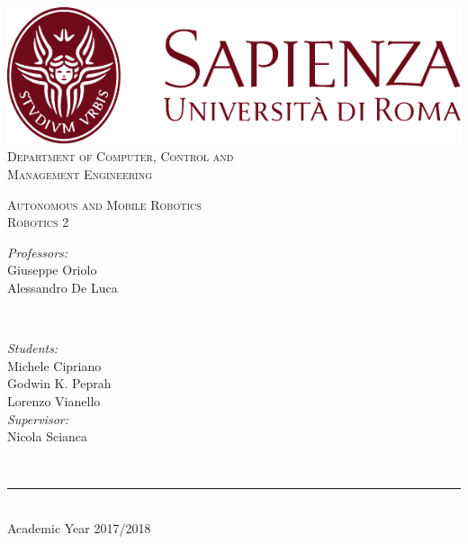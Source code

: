 \documentclass[a4paper]{article}
\begin{document}
\begin{titlepage}
	\centering
    \vspace*{0.5 cm}
    \includegraphics[scale = 0.75]{images/SapienzaLogo}\\[1.0 cm]	%

    \vspace*{-0.4cm}
    \textsc{\large Department of Computer, Control and\\Management Engineering}\\[2.0 cm]	%
    \vspace*{1cm}

    { \fontsize{20.74pt}{18.5pt}\selectfont\bfseries \thetitle \par } %

    \vspace*{0.1cm}
    \textsc{\Large Autonomous and Mobile Robotics\\Robotics 2}\\[0.5 cm] %

    \vspace*{2.6cm}
	\begin{minipage}{0.4\textwidth}
		\begin{flushleft} \large
			\emph{Professors:}\\
			Giuseppe Oriolo\\
            Alessandro De Luca\\
		\end{flushleft}
	\end{minipage}~
	\begin{minipage}{0.4\textwidth}
		\begin{flushright} \large
			\emph{Students:} \\
			Michele Cipriano\\
            Godwin K. Peprah\\
            Lorenzo Vianello\\
            \vspace*{0.2cm}
            \emph{Supervisor:}\\
			Nicola Scianca
		\end{flushright}

	\end{minipage}\\[2 cm]

    \vspace{0.2cm}
    \rule{\linewidth}{0.2 mm} \\[0.3 cm]
    \vspace*{-0.3cm}
    Academic Year 2017/2018
\end{titlepage}
\end{document}
